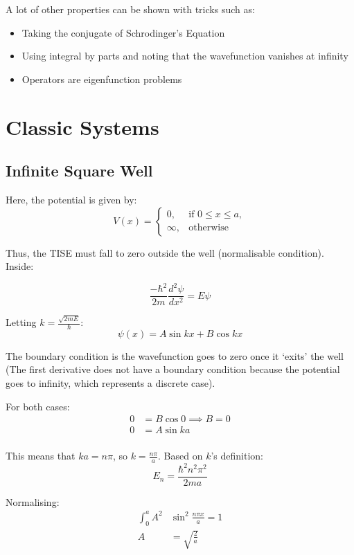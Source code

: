 \documentclass[12pt]{article}
\begin{document}
A lot of other properties can be shown with tricks such as:
\begin{itemize}
    \item Taking the conjugate of Schrodinger's Equation
    \item Using integral by parts and noting that the wavefunction vanishes at infinity
    \item Operators are eigenfunction problems
\end{itemize}

\section{Classic Systems}

\subsection{Infinite Square Well}

Here, the potential is given by:
\[
V(x) =
\left.
\begin{cases}
0, & \text{if } 0 \leq x \leq a,\\
\infty, & \text{otherwise}
\end{cases}
\right.
\]

Thus, the TISE must fall to zero outside the well (normalisable condition). Inside:

\[ \frac{-\hbar^2}{2m}\frac{d^2\psi}{dx^2} = E\psi\]

Letting $k = \frac{\sqrt{2mE}}{\hbar}$:
\[ \psi(x) = A\sin{kx}+B\cos{kx} \]

The boundary condition is the wavefunction goes to zero once it `exits' the well (The first derivative does not have a boundary condition because the potential goes to infinity, which represents a discrete case).

For both cases:
\begin{align*}
    0 &= B\cos{0} \implies B = 0\\
    0 &= A\sin{ka}\\
\end{align*}

This means that $ka = n\pi$, so $k = \frac{n\pi}{a}$. Based on $k$'s definition: 
\[E_n = \frac{\hbar^2 n^2 \pi^2 }{2ma}\]

Normalising:
\begin{align*}
    \int_0^a A^2&\sin^2{\frac{n\pi x}{a}} = 1\\
    A &= \sqrt{\frac2a}
\end{align*}
\end{document}
